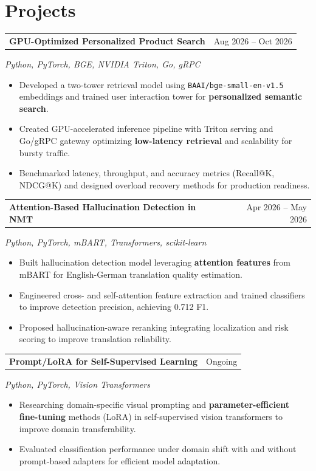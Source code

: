 \documentclass[letterpaper,10pt]{article}
\makeatletter
\newcommand{\entry}[2]{%
  \noindent
  \begin{tabularx}{\linewidth}
    {@{}>{\raggedright\arraybackslash}X@{\hspace{6pt}}r@{}}
    \textbf{#1} & #2
  \end{tabularx}\par
}
\newcommand{\bullets}{
  \begin{itemize}[
    leftmargin=1.2em,
    topsep=2pt,
    itemsep=1pt,
    parsep=0pt,
    partopsep=0pt
  ]
}
\newcommand{\finishbullets}{
  \end{itemize}
}
\makeatother
\begin{document}
\section{Projects}

\entry
  {GPU-Optimized Personalized Product Search}
  {Aug 2026 -- Oct 2026}

\textit{Python, PyTorch, BGE, NVIDIA Triton, Go, gRPC}

\bullets

  \item Developed a two-tower retrieval model using \texttt{BAAI/bge-small-en-v1.5} embeddings and trained user interaction tower for \textbf{personalized semantic search}.

  \item Created GPU-accelerated inference pipeline with Triton serving and Go/gRPC gateway optimizing \textbf{low-latency retrieval} and scalability for bursty traffic.

  \item Benchmarked latency, throughput, and accuracy metrics (Recall@K, NDCG@K) and designed overload recovery methods for production readiness.

\finishbullets

\entry
  {Attention-Based Hallucination Detection in NMT}
  {Apr 2026 -- May 2026}

\textit{Python, PyTorch, mBART, Transformers, scikit-learn}

\bullets

  \item Built hallucination detection model leveraging \textbf{attention features} from mBART for English-German translation quality estimation.

  \item Engineered cross- and self-attention feature extraction and trained classifiers to improve detection precision, achieving 0.712 F1.

  \item Proposed hallucination-aware reranking integrating localization and risk scoring to improve translation reliability.

\finishbullets

\entry
  {Prompt/LoRA for Self-Supervised Learning}
  {Ongoing}

\textit{Python, PyTorch, Vision Transformers}

\bullets

  \item Researching domain-specific visual prompting and \textbf{parameter-efficient fine-tuning} methods (LoRA) in self-supervised vision transformers to improve domain transferability.

  \item Evaluated classification performance under domain shift with and without prompt-based adapters for efficient model adaptation.

\finishbullets
\end{document}
